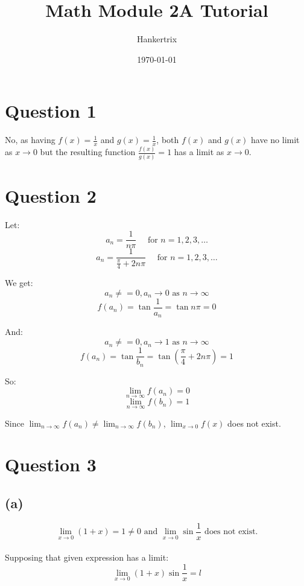 \documentclass[11pt]{article}
\author{Hankertrix}
\date{\today}
\title{Math Module 2A Tutorial}
\begin{document}
\maketitle
\setcounter{tocdepth}{2}
\tableofcontents

\newpage

\section{Question 1}
\label{sec:orgf3c4c2b}
No, as having \(f(x) = \frac{1}{x}\) and \(g(x) = \frac{1}{x}\), both \(f(x)\) and \(g(x)\) have no limit as \(x \rightarrow 0\) but the resulting function \(\frac{f(x)}{g(x)} = 1\) has a limit as \(x \rightarrow 0\).

\section{Question 2}
\label{sec:orgf18323d}
Let:
\[a_n = \frac{1}{n\pi} \quad \text{ for } n = 1, 2, 3, \ldots\]
\[a_n = \frac{1}{\frac{\pi}{4} + 2n\pi} \quad \text{ for } n = 1, 2, 3, \ldots\]

We get:
\[a_n \neq = 0, a_n \rightarrow 0 \text{ as } n \rightarrow \infty\]
\[f(a_n) = \tan \frac{1}{a_n} = \tan n \pi = 0\]

And:
\[a_n \neq = 0, a_n \rightarrow 1 \text{ as } n \rightarrow \infty\]
\[f(a_n) = \tan \frac{1}{b_n} = \tan \left( \frac{\pi}{4} + 2n\pi \right) = 1\]

So:
\[\lim_{n \rightarrow \infty} f(a_n) = 0\]
\[\lim_{n \rightarrow \infty} f(b_n) = 1\]

Since \(\lim_{n \rightarrow \infty} f(a_n) \neq \lim_{n \rightarrow \infty} f(b_n)\), \(\lim_{x \rightarrow 0} f(x)\) does not exist.

\newpage

\section{Question 3}
\label{sec:orge0201ca}

\subsection{(a)}
\label{sec:org839633f}
\[\lim_{x \rightarrow 0} (1 + x) = 1 \neq 0 \text{ and } \lim_{x \rightarrow 0} \sin \frac{1}{x} \text{ does not exist.}\]
\\[0pt]

Supposing that given expression has a limit:
\[\lim_{x \rightarrow 0} (1 + x) \sin \frac{1}{x} = l\]
\end{document}

